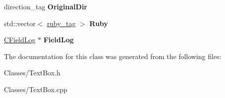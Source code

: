 \begin{DoxyCompactItemize}
\item 
direction\+\_\+tag {\bfseries Original\+Dir}\hypertarget{class_c_text_box_ae9c445673b45a5e2c91508af34cbee8e}{}\label{class_c_text_box_ae9c445673b45a5e2c91508af34cbee8e}

\item 
std\+::vector$<$ \hyperlink{struct_c_text_box_1_1ruby__tag}{ruby\+\_\+tag} $>$ {\bfseries Ruby}\hypertarget{class_c_text_box_aafcb816b49ad87d0c9665ef50613ff4f}{}\label{class_c_text_box_aafcb816b49ad87d0c9665ef50613ff4f}

\item 
\hyperlink{class_c_field_log}{C\+Field\+Log} $\ast$ {\bfseries Field\+Log}\hypertarget{class_c_text_box_a3a9e3391e04d5cc18e7c7a3f393f3b51}{}\label{class_c_text_box_a3a9e3391e04d5cc18e7c7a3f393f3b51}

\end{DoxyCompactItemize}


The documentation for this class was generated from the following files\+:\begin{DoxyCompactItemize}
\item 
Classes/Text\+Box.\+h\item 
Classes/Text\+Box.\+cpp\end{DoxyCompactItemize}
